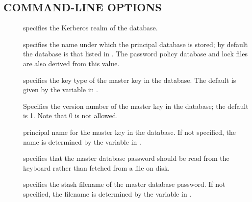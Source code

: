 \documentclass[letterpaper,10pt,english]{sphinxmanual}
\begin{document}
\subsection{COMMAND-LINE OPTIONS}
\label{\detokenize{admin/admin_commands/kdb5_util:command-line-options}}\label{\detokenize{admin/admin_commands/kdb5_util:kdb5-util-options}}\begin{description}
\item[{ }] \leavevmode
specifies the Kerberos realm of the database.

\item[{ }] \leavevmode
specifies the name under which the principal database is stored;
by default the database is that listed in {\hyperref[\detokenize{admin/conf_files/kdc_conf:kdc-conf-5}]{}}.  The
password policy database and lock files are also derived from this
value.

\item[{ }] \leavevmode
specifies the key type of the master key in the database.  The
default is given by the  variable in
{\hyperref[\detokenize{admin/conf_files/kdc_conf:kdc-conf-5}]{}}.

\item[{ }] \leavevmode
Specifies the version number of the master key in the database;
the default is 1.  Note that 0 is not allowed.

\item[{ }] \leavevmode
principal name for the master key in the database.  If not
specified, the name is determined by the 
variable in {\hyperref[\detokenize{admin/conf_files/kdc_conf:kdc-conf-5}]{}}.

\item[{}] \leavevmode
specifies that the master database password should be read from
the keyboard rather than fetched from a file on disk.

\item[{ }] \leavevmode
specifies the stash filename of the master database password.  If
not specified, the filename is determined by the
 variable in {\hyperref[\detokenize{admin/conf_files/kdc_conf:kdc-conf-5}]{}}.


\end{description}
\end{document}
